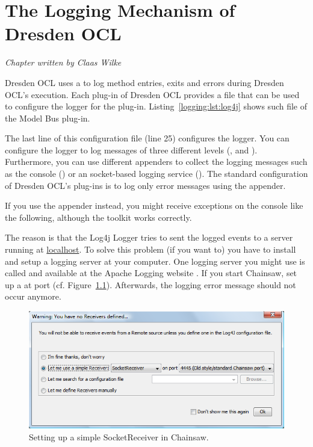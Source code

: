 \chapter{The Logging Mechanism of Dresden OCL}
\label{chapter:logging}

\begin{flushright}
\textit{Chapter written by Claas Wilke}
\end{flushright}

Dresden OCL uses a  to log method entries, exits and
errors during Dresden OCL's execution. Each plug-in of Dresden OCL provides a
 file that can be used to configure the logger for the
plug-in. Listing~\ref{logging:lst:log4j} shows such file of the Model Bus
plug-in.

\begin{figure}[!t]
  
\end{figure}

The last line of this configuration file (line 25) configures the logger. You
can configure the logger to log messages of three different levels
(,  and ). Furthermore, you can use different
appenders to collect the logging messages such as the console () or
an socket-based logging service (). The standard configuration of
Dresden OCL's plug-ins is to log only error messages using the 
appender.

If you use the  appender instead, you might
receive exceptions on the console like the following, although the toolkit 
works correctly.

\begin{center}
\end{center}

The reason is that the Log4j Logger tries to sent the logged events to a server 
running at \url{localhost}. To solve this problem (if you want to) you have to 
install and setup a logging server at your computer. One logging server you
might use is called  and available at the Apache Logging 
website \cite{WWW:chainsaw}. If you start Chainsaw, set up a 
 at port  (cf. Figure~\ref{pic:logging:chainsaw01}). Afterwards, the logging error 
message should not occur anymore.

\begin{figure}[!htbp]
	\centering
	\includegraphics[width=0.8\linewidth]{figures/logging/chainsaw01}
	\caption{Setting up a simple SocketReceiver in Chainsaw.}
	\label{pic:logging:chainsaw01}
\end{figure}